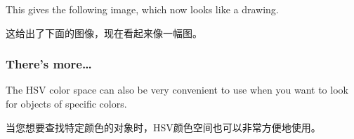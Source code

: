 \documentclass[]{article}
\begin{document}
This gives the following image, which now looks like a drawing.

这给出了下面的图像，现在看起来像一幅图。

\hypertarget{header-n1438}{%
\subsubsection{There's more\ldots{}}\label{header-n1438}}

The HSV color space can also be very convenient to use when you want to
look for objects of specific colors.

当您想要查找特定颜色的对象时，HSV颜色空间也可以非常方便地使用。
\end{document}

